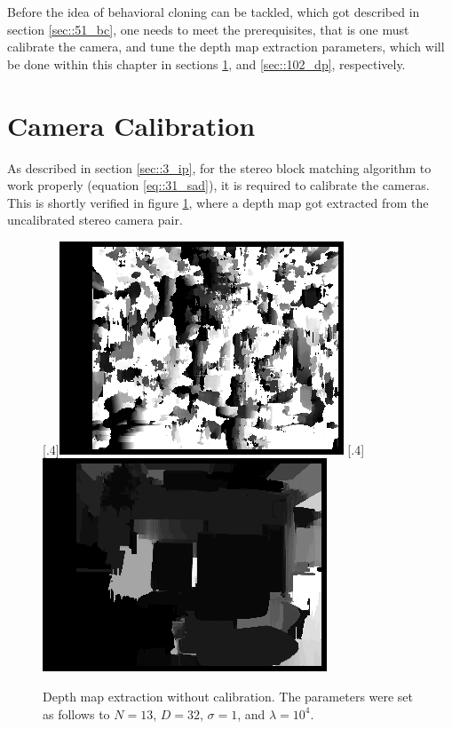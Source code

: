\FloatBarrier
\label{sec::10_ip}
Before the idea of behavioral cloning can be tackled, which got described in section \ref{sec::51_bc}, one needs to meet the prerequisites, that is one must calibrate the camera, and tune the depth map extraction parameters, which will be done within this chapter in sections \ref{sec::10_cc}, and \ref{sec::102_dp}, respectively.
\section{Camera Calibration}
\label{sec::10_cc}
As described in section \ref{sec::3_ip}, for the stereo block matching algorithm to work properly (equation \ref{eq::31_sad}), it is required to calibrate the cameras. This is shortly verified in figure \ref{fig::101_no_calib}, where a depth map got extracted from the uncalibrated stereo camera pair.
\begin{figure}[h!]
	\centering
	[.4\linewidth]{\includegraphics[scale=.3]{chapters/10_image_processing_experiments/img/disp_no_calib.png}}
	[.4\linewidth]{\includegraphics[scale=.3]{chapters/10_image_processing_experiments/img/wls_no_calib.png}}
	\caption{Depth map extraction without calibration. The parameters were set as follows to $N=13$, $D=32$, $\sigma = 1$, and $\lambda=10^4$.}
	\label{fig::101_no_calib}
\end{figure}
